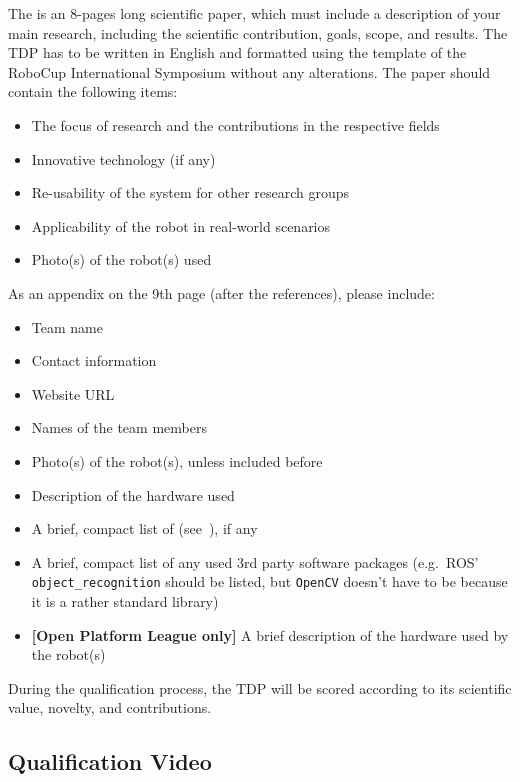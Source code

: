 The \TDP{} is an 8-pages long scientific paper, which must include a description of your main research, including the scientific contribution, goals, scope, and results.
The TDP has to be written in English and formatted using the template of the RoboCup International Symposium without any alterations.
The paper should contain the following items:
\begin{itemize}
	\item The focus of research and the contributions in the respective fields
	\item Innovative technology (if any)
	\item Re-usability of the system for other research groups
	\item Applicability of the robot in real-world scenarios
	\item Photo(s) of the robot(s) used
\end{itemize}
As an appendix on the 9th page (after the references), please include:
\begin{itemize}
	\item Team name
	\item Contact information
	\item Website URL
	\item Names of the team members
	\item Photo(s) of the robot(s), unless included before
	\item Description of the hardware used
	\item A brief, compact list of  (see~), if any
	\item A brief, compact list of any used 3rd party software packages (e.g.~ROS' \texttt{object\_recognition} should be listed, but \texttt{OpenCV} doesn't have to be because it is a rather standard library)
	\item \textbf{[Open Platform League only]} A brief description of the hardware used by the robot(s)
\end{itemize}

During the qualification process, the TDP will be scored according to its scientific value, novelty, and contributions.

\subsection{Qualification Video}

